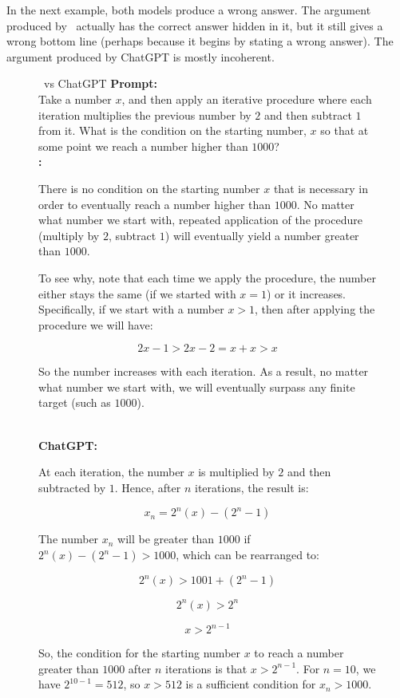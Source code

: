 In the next example, both models produce a wrong answer. The argument produced by \DV \ actually has the correct answer hidden in it, but it still gives a wrong bottom line (perhaps because it begins by stating a wrong answer). The argument produced by ChatGPT is mostly incoherent.
\begin{figure}[H]
\begin{AIbox}{\DV \ vs ChatGPT}
{\bf Prompt:} \\
{\scriptsize
Take a number $x$, and then apply an iterative procedure where each iteration multiplies the previous number by $2$ and then subtract $1$ from it. What is the condition on the starting number, $x$ so that at some point we reach a number higher than $1000$? 
}\\

{\bf \DV:} \\
{\scriptsize
There is no condition on the starting number $x$ that is necessary in order to eventually reach a number higher than $1000$. No matter what number we start with, repeated application of the procedure (multiply by $2$, subtract $1$) will eventually yield a number greater than $1000$.

To see why, note that each time we apply the procedure, the number either stays the same (if we started with $x=1$) or it increases. Specifically, if we start with a number $x>1$, then after applying the procedure we will have:

$$2x-1 > 2x-2 = x+x > x$$

So the number increases with each iteration. As a result, no matter what number we start with, we will eventually surpass any finite target (such as $1000$).
}\\

{\bf ChatGPT:} \\
{\scriptsize
At each iteration, the number $x$ is multiplied by $2$ and then subtracted by $1$. Hence, after $n$ iterations, the result is:

$$x_n = 2^n (x) - (2^n - 1)$$

The number $x_n$ will be greater than $1000$ if $2^n (x) - (2^n - 1) > 1000$, which can be rearranged to:

$$2^n (x) > 1001 + (2^n - 1)$$

$$2^n (x) > 2^n$$

$$x > 2^{n-1}$$

So, the condition for the starting number $x$ to reach a number greater than $1000$ after $n$ iterations is that $x > 2^{n-1}$. For $n=10$, we have $2^{10-1} = 512$, so $x > 512$ is a sufficient condition for $x_n > 1000$.
}
\end{AIbox}
\end{figure}

